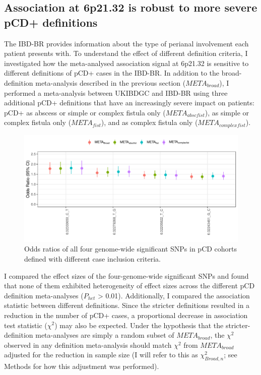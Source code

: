     \subsection{Association at 6p21.32 is robust to more severe pCD+ definitions}


The IBD-BR provides information about the type of perianal involvement each patient presents with. To understand the effect of different definition criteria, I investigated how the meta-analysed association signal at 6p21.32 is sensitive to different definitions of pCD+ cases in the IBD-BR. In addition to the broad-definition meta-analysis described in the previous section ($META_{broad}$), I performed a meta-analysis between UKIBDGC and IBD-BR using three additional pCD+ definitions that have an increasingly severe impact on patients: pCD+ as abscess or simple or complex fistula only ($META_{abscfist}$), as simple or complex fistula only ($META_{fist}$), and as complex fistula only ($META_{complexfist}$). 

\begin{figure}[H] 
  \centering    
  \includegraphics[width=1.0\textwidth]{pcd_def_or_plot}
  \caption[Effect sizes of genome-wide significant SNPs with different pCD definitions]{Odds ratios of all four genome-wide significant SNPs in pCD cohorts defined with different case inclusion criteria.}
  \label{fig:pcd_def_or_plot}
  \end{figure}


I compared the effect sizes of the four-genome-wide significant SNPs and found that none of them exhibited heterogeneity of effect sizes across the different pCD definition meta-analyses ($P_{het}$ > 0.01). Additionally, I compared the association statistic between different definitions. Since the stricter definitions resulted in a reduction in the number of pCD+ cases, a proportional decrease in association test statistic ($\chi^{2}$) may also be expected. Under the hypothesis that the stricter-definition meta-analyses are simply a random subset of $META_{broad}$, the $\chi^{2}$  observed in any definition meta-analysis should match $\chi^{2}$ from $META_{broad}$ adjusted for the reduction in sample size (I will refer to this as $\chi^{2}_{Broad,n}$; see Methods for how this adjustment was performed). \\

